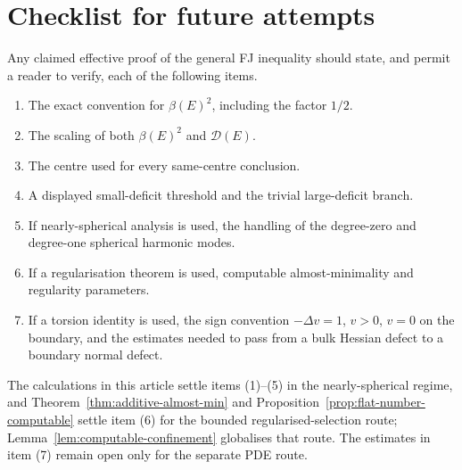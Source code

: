 \documentclass[11pt]{amsart}
\theoremstyle{definition}
\newcommand{\Def}{\mathcal D}
\begin{document}
\section{Checklist for future attempts}\label{sec:checklist}

Any claimed effective proof of the general FJ inequality should state, and
permit a reader to verify, each of the following items.
\begin{enumerate}[label=\textnormal{(\arabic*)},leftmargin=2.6em]
\item The exact convention for \(\beta(E)^2\), including the factor \(1/2\).
\item The scaling of both \(\beta(E)^2\) and \(\Def(E)\).
\item The centre used for every same-centre conclusion.
\item A displayed small-deficit threshold and the trivial large-deficit
branch.
\item If nearly-spherical analysis is used, the handling of the degree-zero
and degree-one spherical harmonic modes.
\item If a regularisation theorem is used, computable almost-minimality and
regularity parameters.
\item If a torsion identity is used, the sign convention
\(-\Delta v=1\), \(v>0\), \(v=0\) on the boundary, and the estimates needed
to pass from a bulk Hessian defect to a boundary normal defect.
\end{enumerate}

The calculations in this article settle items (1)--(5) in the
nearly-spherical regime, and Theorem~\ref{thm:additive-almost-min}
and Proposition~\ref{prop:flat-number-computable} settle item (6) for
the bounded regularised-selection route; Lemma~\ref{lem:computable-confinement}
globalises that route.  The estimates in item (7) remain open only for the
separate PDE route.
\end{document}
